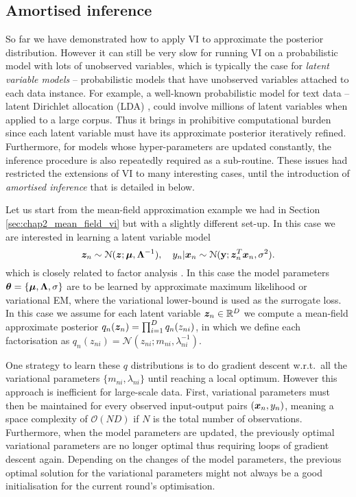 \subsection{Amortised inference}
\label{sec:chap2_amortisation}
So far we have demonstrated how to apply VI to approximate the posterior distribution. However it can still be very slow for running VI on a probabilistic model with lots of unobserved variables, which is typically the case for \emph{latent variable models} -- probabilistic models that have unobserved variables attached to each data instance. For example, a well-known probabilistic model for text data -- latent Dirichlet allocation (LDA) \citep{blei:lda2003}, could involve millions of latent variables when applied to a large corpus. Thus it brings in prohibitive computational burden since each latent variable must have its approximate posterior iteratively refined. Furthermore, for models whose hyper-parameters are updated constantly, the inference procedure is also repeatedly required as a sub-routine. These issues had restricted the extensions of VI to many interesting cases, until the introduction of \emph{amortised inference} that is detailed in below.

Let us start from the mean-field approximation example we had in Section \ref{sec:chap2_mean_field_vi} but with a slightly different set-up. In this case we are interested in learning a latent variable model 
\begin{equation*}
\bm{z}_n \sim \mathcal{N}(\bm{z}; \bm{\mu}, \bm{\Lambda}^{-1}), \quad y_n | \bm{x}_n \sim \mathcal{N}(\mathbf{y}; \bm{z}_n^T \bm{x}_n, \sigma^2).
\end{equation*}
which is closely related to factor analysis \citep{harman:factor_analysis1976, roweis:linear1999}. In this case the model parameters $\bm{\theta} = \{ \bm{\mu}, \bm{\Lambda}, \sigma \}$ are to be learned by approximate maximum likelihood or variational EM, where the variational lower-bound is used as the surrogate loss. In this case we assume for each latent variable $\bm{z}_n \in \mathbb{R}^D$ we compute a mean-field approximate posterior $q_n(\bm{z}_n) = \prod_{i=1}^D q_n(z_{ni})$, in which we define each factorisation as $q_n(z_{ni}) = \mathcal{N}(z_{ni}; m_{ni}, \lambda_{ni}^{-1})$. 

One strategy to learn these $q$ distributions is to do gradient descent w.r.t.~all the variational parameters $\{ m_{ni}, \lambda_{ni} \}$ until reaching a local optimum. However this approach is inefficient for large-scale data. First, variational parameters must then be maintained for every observed input-output pairs $( \bm{x}_n, y_n )$, meaning a space complexity of $\mathcal{O}(ND)$ if $N$ is the total number of observations. Furthermore, when the model parameters are updated, the previously optimal variational parameters are no longer optimal thus requiring loops of gradient descent again. Depending on the changes of the model parameters, the previous optimal solution for the variational parameters might not always be a good initialisation for the current round's optimisation.

